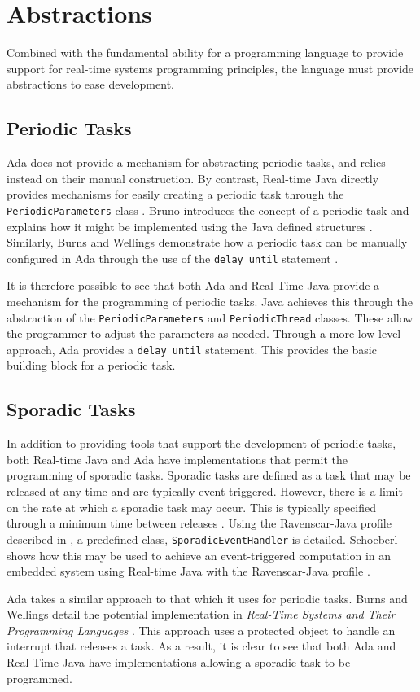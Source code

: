 \section{Abstractions}

Combined with the fundamental ability for a programming language to provide
support for real-time systems programming principles, the language must provide
abstractions to ease development.

\subsection{Periodic Tasks} 
Ada does not provide a mechanism for
abstracting periodic tasks, and relies instead on their manual construction. 
By contrast, Real-time Java directly provides mechanisms for easily creating a periodic task
through the \texttt{PeriodicParameters} class \cite{real-time-systems}. 
Bruno  introduces the concept of a periodic task
and explains how it might be implemented using the Java defined
structures \cite{periodic-java-thread}.
Similarly, Burns and Wellings 
demonstrate how a periodic task can be manually configured in
Ada through the use of the \texttt{delay until} statement \cite{burns1998concurrency}.
\par\bigskip\noindent
It is therefore possible to see that both Ada and
Real-Time Java provide a mechanism for the programming of periodic tasks. Java
achieves this through the abstraction of the \texttt{PeriodicParameters} and
\texttt{PeriodicThread} classes.  These allow the programmer to adjust the 
parameters as needed.  Through a more low-level
approach, Ada provides a \texttt{delay until}
statement. This provides the basic building block for a periodic task.

\subsection{Sporadic Tasks}
In addition to providing tools that support the development of periodic tasks,
both Real-time Java and Ada have implementations that permit the programming of
sporadic tasks.  Sporadic tasks are defined as a task that may be
released at any time and are typically event triggered. However,
there is a limit on the rate at which a sporadic task may occur. This is
typically specified through a minimum time between releases \cite{11111101}.
Using the Ravenscar-Java profile described in \cite{ravenscar-java}, a
predefined class, \texttt{SporadicEventHandler} is detailed. Schoeberl shows
how this may be used to achieve an event-triggered computation in an embedded
system using Real-time Java with the Ravenscar-Java profile \cite{1300334}.
\par\bigskip\noindent
Ada takes a similar approach to that which it uses for periodic tasks. Burns
and Wellings detail the potential implementation in \emph{Real-Time Systems and
Their Programming Languages} \cite[p341]{real-time-systems}.  This approach
uses a protected object to handle an interrupt that releases a task.
As a result, it is clear to see that both Ada and Real-Time Java have
implementations allowing a sporadic task to be programmed. 

